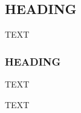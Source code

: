 \documentclass[gmd, manuscript]{copernicus}
\begin{document}
\subsection{HEADING}
TEXT


\subsubsection{HEADING}
TEXT


\conclusions  %
TEXT












\appendix
\section{}    %

\subsection{}     %


\noappendix       %


\end{document}
